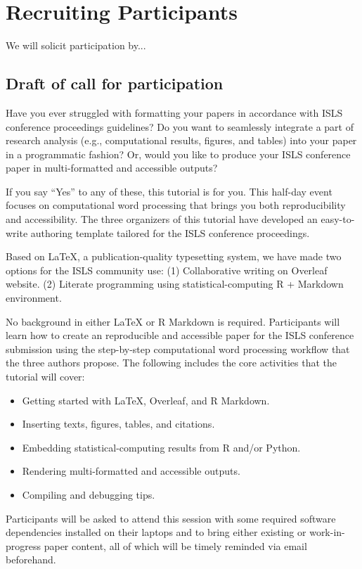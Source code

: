 \documentclass{article}
\begin{document}
\section{Recruiting Participants}
We will solicit participation by...
\subsection{Draft of call for participation }

Have you ever struggled with formatting your papers in accordance with ISLS conference proceedings guidelines? Do you want to seamlessly integrate a part of research analysis (e.g., computational results, figures, and tables) into your paper in a programmatic fashion? Or, would you like to produce your ISLS conference paper in multi-formatted and accessible outputs?

If you say “Yes” to any of these, this tutorial is for you. This half-day event focuses on computational word processing that brings you both reproducibility and accessibility. The three organizers of this tutorial have developed an easy-to-write authoring template tailored for the ISLS conference proceedings.

Based on LaTeX, a publication-quality typesetting system, we have made two options for the ISLS community use: (1) Collaborative writing on Overleaf website. (2) Literate programming using statistical-computing R + Markdown environment.

No background in either LaTeX or R Markdown is required. Participants will learn how to create an reproducible and accessible paper for the ISLS conference submission using the step-by-step computational word processing workflow that the three authors propose. The following includes the core activities that the tutorial will cover:

\begin{itemize}
  \item Getting started with LaTeX, Overleaf, and R Markdown.
  \item Inserting texts, figures, tables, and citations.
  \item Embedding statistical-computing results from R and/or Python.
  \item Rendering multi-formatted and accessible outputs.
  \item Compiling and debugging tips.
\end{itemize}

Participants will be asked to attend this session with some required software dependencies installed on their laptops and to bring either existing or work-in-progress paper content, all of which will be timely reminded via email beforehand.


\end{document}
